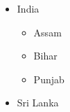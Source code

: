 \documentclass[11pt,a4paper]{article}
\begin{document}
    \begin{itemize}
        \item India
        \begin{itemize}
            \item Assam
            \item Bihar
            \item Punjab
        \end{itemize}
        \item Sri Lanka
    \end{itemize}
\end{document}
